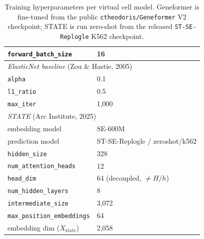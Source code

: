 \documentclass{article}
\begin{document}
\begin{table}[h]
\begin{tabular}{ll}
\hspace{1em}\texttt{forward\_batch\_size}                  & 16 \\
\midrule
\multicolumn{2}{l}{\textit{ElasticNet baseline} (Zou \& Hastie, 2005)} \\
\hspace{1em}\texttt{alpha}                                 & 0.1 \\
\hspace{1em}\texttt{l1\_ratio}                             & 0.5 \\
\hspace{1em}\texttt{max\_iter}                             & 1{,}000 \\
\midrule
\multicolumn{2}{l}{\textit{STATE} (Arc Institute, 2025)} \\
\hspace{1em}embedding model                                & SE-600M \\
\hspace{1em}prediction model                               & ST-SE-Replogle / zeroshot/k562 \\
\hspace{1em}\texttt{hidden\_size}                          & 328 \\
\hspace{1em}\texttt{num\_attention\_heads}                 & 12 \\
\hspace{1em}\texttt{head\_dim}                             & 64 (decoupled, $\neq H/h$) \\
\hspace{1em}\texttt{num\_hidden\_layers}                   & 8 \\
\hspace{1em}\texttt{intermediate\_size}                    & 3{,}072 \\
\hspace{1em}\texttt{max\_position\_embeddings}             & 64 \\
\hspace{1em}embedding dim ($X_{\mathrm{state}}$)           & 2{,}058 \\
\bottomrule
\end{tabular}
\caption{Training hyperparameters per virtual cell model. Geneformer is fine-tuned from the public \texttt{ctheodoris/Geneformer} V2 checkpoint; STATE is run zero-shot from the released \texttt{ST-SE-Replogle} K562 checkpoint.}
\label{tab:hparams}
\end{table}
\end{document}
